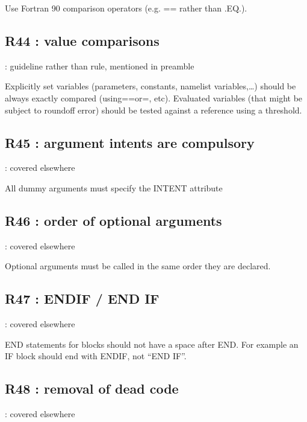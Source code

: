 \documentclass[letterpaper,10pt,english]{sphinxmanual}
\begin{document}
Use Fortran 90 comparison operators (e.g. == rather than .EQ.).


\subsection{R44 : value comparisons}
\label{\detokenize{obsolescent/r44:r44-value-comparisons}}\label{\detokenize{obsolescent/r44::doc}}
 : guideline rather than rule, mentioned in preamble

Explicitly set variables (parameters, constants, namelist variables,…) should be always exactly
compared (using==or=, etc).
Evaluated variables (that might be subject to roundoff error) should be tested against a reference using a threshold.


\subsection{R45 : argument intents are compulsory}
\label{\detokenize{obsolescent/r45:r45-argument-intents-are-compulsory}}\label{\detokenize{obsolescent/r45::doc}}
 : covered elsewhere

All dummy arguments must specify the INTENT attribute


\subsection{R46 : order of optional arguments}
\label{\detokenize{obsolescent/r46:r46-order-of-optional-arguments}}\label{\detokenize{obsolescent/r46::doc}}
 : covered elsewhere

Optional arguments must be called in the same order they are declared.


\subsection{R47 :  ENDIF / END IF}
\label{\detokenize{obsolescent/r47:r47-endif-end-if}}\label{\detokenize{obsolescent/r47::doc}}
 : covered elsewhere

END statements for blocks should not have a space after END. For example an IF block
should end with ENDIF, not “END IF”.


\subsection{R48 :  removal of dead code}
\label{\detokenize{obsolescent/r48:r48-removal-of-dead-code}}\label{\detokenize{obsolescent/r48::doc}}
 : covered elsewhere
\end{document}
